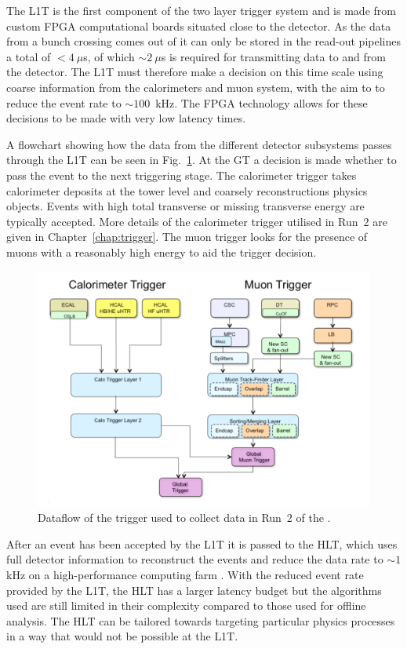 The \ac{L1T} is the first component of the two layer trigger system
and is made from custom \ac{FPGA} computational boards situated close
to the detector.  As the data from a bunch crossing comes out of \CMS
it can only be stored in the read-out pipelines a total of $<4~\mu$s,
of which $\sim2~\mu$s is required for transmitting data to and from
the detector. The \ac{L1T} must therefore make a decision on this time
scale using coarse information from the calorimeters and muon system,
with the aim to to reduce the event rate to $\sim100$~kHz. The
\ac{FPGA} technology allows for these decisions to be made with very
low latency times.

A flowchart showing how the data from the different detector
subsystems passes through the \ac{L1T} can be seen in
Fig.~\ref{fig:l1t}. At the \ac{GT} a decision is made whether to
pass the event to the next triggering stage. The calorimeter trigger
takes calorimeter deposits at the tower level and coarsely
reconstructions physics objects. Events with high total transverse or
missing transverse energy are typically accepted.  More details of the
calorimeter trigger utilised in Run~2 are given in
Chapter~\ref{chap:trigger}. The muon trigger looks for the presence of
muons with a reasonably high energy to aid the trigger decision.

\begin{figure}
\begin{center}
\includegraphics[width=0.8\linewidth]{figs/cms_triggerflowchart} \end{center}
\caption{ Dataflow of the trigger used to collect data in Run~2 of the
\LHC \cite{Tapper:1556311}.}
\label{fig:l1t} \end{figure}

After an event has been accepted by the \ac{L1T} it is passed to the
\ac{HLT}, which uses full detector information to reconstruct the
events and reduce the data rate to $\sim1$kHz on a high-performance
computing farm \cite{Cittolin:578006}.  With the reduced event rate
provided by the \ac{L1T}, the \ac{HLT} has a larger latency budget but
the algorithms used are still limited in their complexity compared to
those used for offline analysis. The \ac{HLT} can be tailored
towards targeting particular physics processes in a way that would not
be possible at the \ac{L1T}.

